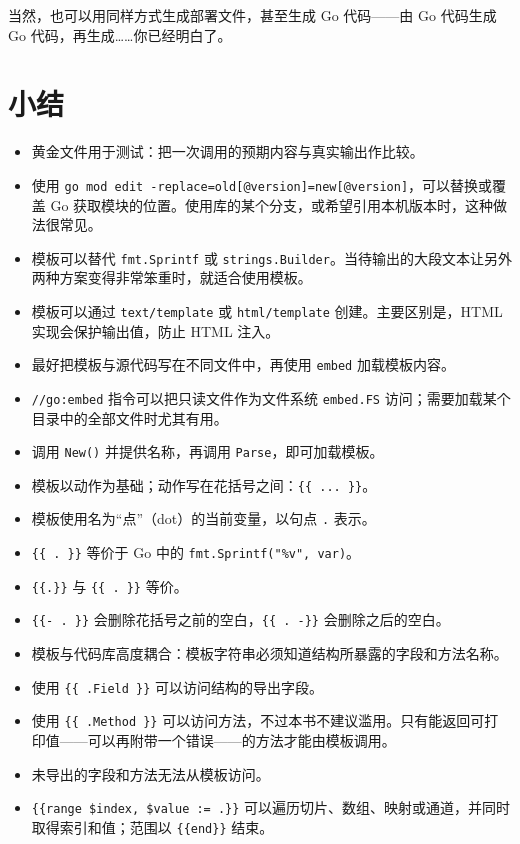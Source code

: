 当然，也可以用同样方式生成部署文件，甚至生成 Go 代码——由 Go 代码生成 Go 代码，再生成……你已经明白了。

\section*{小结}

\begin{itemize}
  \item 黄金文件用于测试：把一次调用的预期内容与真实输出作比较。
  \item 使用 \texttt{go mod edit -replace=old[@version]=new[@version]}，可以替换或覆盖 Go 获取模块的位置。使用库的某个分支，或希望引用本机版本时，这种做法很常见。
  \item 模板可以替代 \texttt{fmt.Sprintf} 或 \texttt{strings.Builder}。当待输出的大段文本让另外两种方案变得非常笨重时，就适合使用模板。
  \item 模板可以通过 \texttt{text/template} 或 \texttt{html/template} 创建。主要区别是，HTML 实现会保护输出值，防止 HTML 注入。
  \item 最好把模板与源代码写在不同文件中，再使用 \texttt{embed} 加载模板内容。
  \item \texttt{//go:embed} 指令可以把只读文件作为文件系统 \texttt{embed.FS} 访问；需要加载某个目录中的全部文件时尤其有用。
  \item 调用 \texttt{New()} 并提供名称，再调用 \texttt{Parse}，即可加载模板。
  \item 模板以动作为基础；动作写在花括号之间：\texttt{\{\{ ... \}\}}。
  \item 模板使用名为“点”（dot）的当前变量，以句点 \texttt{.} 表示。
  \item \texttt{\{\{ . \}\}} 等价于 Go 中的 \texttt{fmt.Sprintf("\%v", var)}。
  \item \texttt{\{\{.\}\}} 与 \texttt{\{\{ . \}\}} 等价。
  \item \texttt{\{\{- . \}\}} 会删除花括号之前的空白，\texttt{\{\{ . -\}\}} 会删除之后的空白。
  \item 模板与代码库高度耦合：模板字符串必须知道结构所暴露的字段和方法名称。
  \item 使用 \texttt{\{\{ .Field \}\}} 可以访问结构的导出字段。
  \item 使用 \texttt{\{\{ .Method \}\}} 可以访问方法，不过本书不建议滥用。只有能返回可打印值——可以再附带一个错误——的方法才能由模板调用。
  \item 未导出的字段和方法无法从模板访问。
  \item \texttt{\{\{range \$index, \$value := .\}\}} 可以遍历切片、数组、映射或通道，并同时取得索引和值；范围以 \texttt{\{\{end\}\}} 结束。

\end{itemize}
